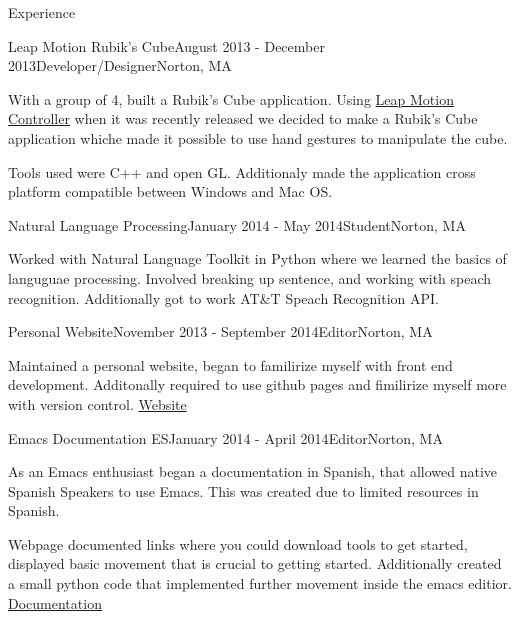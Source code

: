 \documentclass{resume} %
\begin{document}
\begin{rSection}{Experience}

\begin{rSubsection}{Leap Motion Rubik's Cube}{August 2013 - December 2013}{Developer/Designer}{Norton, MA}
\item With a group of 4, built a Rubik's Cube application. Using \href{https://www.leapmotion.com/}{Leap Motion Controller} when it was recently released we decided to make a Rubik's Cube application whiche made it possible to use hand gestures to manipulate the cube. 

\item Tools used were C++  and open GL. Additionaly made the application cross platform compatible between Windows and Mac OS.  

\end{rSubsection}


\begin{rSubsection}{Natural Language Processing}{January 2014 - May 2014}{Student}{Norton, MA}
\item Worked with Natural Language Toolkit in Python where we learned the basics of languguae processing.  Involved breaking up sentence, and working with speach recognition. Additionally got to work AT\&T Speach Recognition API. 



\begin{rSubsection}{Personal Website}{November 2013 - September 2014}{Editor}{Norton, MA}
\item  Maintained a personal website, began to familirize myself with front end development. Additonally required to use github pages and fimilirize myself more with version control. \href{http://guti15.github.io/}{Website}


\end{rSubsection}


\begin{rSubsection}{Emacs Documentation ES}{January 2014 - April 2014}{Editor}{Norton, MA}
\item As an Emacs enthusiast began a documentation in Spanish, that allowed native Spanish Speakers to use Emacs.  This was created due to limited resources in Spanish. 
\item Webpage documented links where you could download tools to get started, displayed basic movement that is crucial to getting started.  Additionally created a small python code that implemented further movement inside the emacs editior. \href{http://guti15.github.io/Emacs_Documentation_es/Intro.html}{Documentation}


\end{rSubsection}
\end{rSubsection}
\end{rSection}
\end{document}
